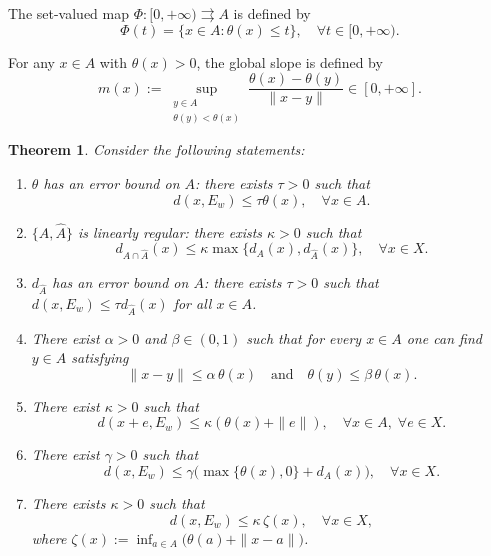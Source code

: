 \documentclass[10pt,a4paper]{amsart}
\newtheorem{theorem}{Theorem}[section]
\begin{document}
 



The set-valued map $\Phi:[0,+\infty)\rightrightarrows A$ is defined by
$$\Phi(t)=\{x\in A:\theta(x)\le t\}, \quad  \forall t \in [0,+\infty).$$

For any \(x\in A\) with \(\theta(x)>0\),  the  global slope is defined by
\[
m(x):=\sup_{\substack{y\in A\\ \theta(y)<\theta(x)}}\frac{\theta(x)-\theta(y)}{\|x-y\|}\in[0,+\infty].
\]


\begin{theorem} \label{XLWCJK}  Consider the following statements:
	\begin{enumerate}
		\item[(i)] $\theta$ has an error bound on $A$: there exists $\tau>0$ such that
		\begin{equation}\label{EBAQJ} 
			d(x,E_w)\le\tau \theta(x), \quad  \forall x\in A.
		\end{equation}		 
		\item[(ii)] $\{A,\widehat{A}\}$ is linearly regular: there exists $\kappa>0$ such that
				 $$d_{A\cap\widehat{A}}(x)\le\kappa\max\{d_A(x),d_{\widehat{A}}(x)\},   \quad  \forall     x\in X. $$  
		 
		\item[(iii)] $d_{\widehat{A}}$ has an error bound on $A$: there exists $\tau>0$ such that $d(x,E_w)\le\tau d_{\widehat{A}}(x)$ for all $x\in A$.
		\item[(iv)]  There exist  \(\alpha > 0\) and \(\beta \in (0,1)\) such that for every \(x \in A\) one can find \(y \in A\) satisfying
		\begin{equation}\label{EYZXJ} 
		\|x - y\| \le \alpha\,\theta(x) \quad\text{and}\quad \theta(y) \le \beta\,\theta(x).
		\end{equation}	
		\item[(v)]  There exist \(\kappa > 0\) such that  
		\begin{equation}\label{EBkkQJ} 
		d(x+e, E_w) \le \kappa (\theta(x) + \|e\|),  \quad  \forall x \in A, \;    \forall e \in X.
			\end{equation}	
		
		\item[(vi)]  There exist $\gamma>0$ such that  
		\begin{equation}\label{EBkXJ} 
		d(x,E_w)\le \gamma\bigl(\max\{\theta(x),0\}+d_A(x)\bigr),\quad \forall x\in X .
				\end{equation}	
		
		\item[(vii)]  There exists   \(\kappa > 0\) such that  
			$$			d(x, E_w) \le \kappa \, \zeta(x), \quad \forall x \in X, 		$$
			where  $\zeta(x) := \inf_{a \in A} \bigl( \theta(a) + \|x - a\| \bigr)$.
			

\end{enumerate}
\end{theorem}
\end{document}
